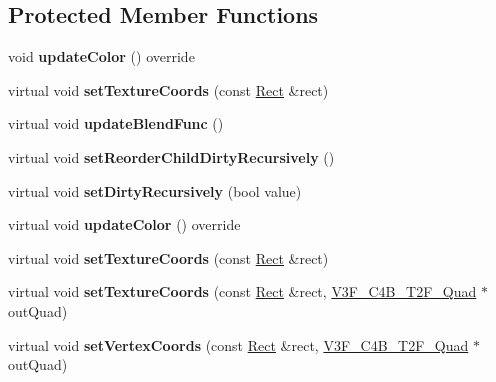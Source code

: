 \subsection*{Protected Member Functions}
\begin{DoxyCompactItemize}
\item 
\mbox{\label{classSprite_ae2636c078d511ee94cd3d8642b76d13e}} 
void {\bfseries update\+Color} () override
\item 
\mbox{\label{classSprite_ad200da9cb471295f96e514e0d08b8697}} 
virtual void {\bfseries set\+Texture\+Coords} (const \hyperlink{classRect}{Rect} \&rect)
\item 
\mbox{\label{classSprite_aa38fb15a8fd6c8702d682284a75a79c1}} 
virtual void {\bfseries update\+Blend\+Func} ()
\item 
\mbox{\label{classSprite_a999a297812a130cf506372627fb93cd7}} 
virtual void {\bfseries set\+Reorder\+Child\+Dirty\+Recursively} ()
\item 
\mbox{\label{classSprite_a3d6c47674b1824877afd2623e87946ae}} 
virtual void {\bfseries set\+Dirty\+Recursively} (bool value)
\item 
\mbox{\label{classSprite_a123da822f86278487973a1613eb0b8cc}} 
virtual void {\bfseries update\+Color} () override
\item 
\mbox{\label{classSprite_abed98f08cf9ddbb9ffdae42e570da60c}} 
virtual void {\bfseries set\+Texture\+Coords} (const \hyperlink{classRect}{Rect} \&rect)
\item 
\mbox{\label{classSprite_a64d6aa4369268e445e4496ac26da423a}} 
virtual void {\bfseries set\+Texture\+Coords} (const \hyperlink{classRect}{Rect} \&rect, \hyperlink{structV3F__C4B__T2F__Quad}{V3\+F\+\_\+\+C4\+B\+\_\+\+T2\+F\+\_\+\+Quad} $\ast$out\+Quad)
\item 
\mbox{\label{classSprite_a4f3d815381158468b54167da37543ecc}} 
virtual void {\bfseries set\+Vertex\+Coords} (const \hyperlink{classRect}{Rect} \&rect, \hyperlink{structV3F__C4B__T2F__Quad}{V3\+F\+\_\+\+C4\+B\+\_\+\+T2\+F\+\_\+\+Quad} $\ast$out\+Quad)

\end{DoxyCompactItemize}
